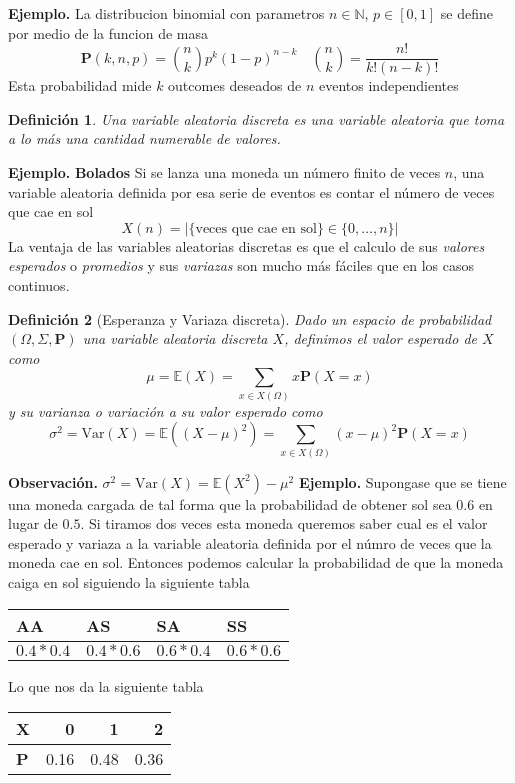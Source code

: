 \documentclass[letterpaper]{article}
\newtheorem{def.}{Definici\'on}[section]
\newcommand{\nat}{\ensuremath{ \mathbb N }}
\newcommand{\prob}{\textbf{P}}
\newcommand{\esp}{\mathbb E}
\newcommand{\eje}{{\newline \noindent \sc \textbf{Ejemplo. }}}
\newcommand{\obs}{{\newline \noindent \sc \textbf{Observación. }}}
\newcommand{\om}{\ensuremath{\Omega}}
\newcommand{\sig}{\ensuremath{\Sigma}}
\begin{document}
\eje La distribucion binomial con parametros \(n\in\nat\), \(p\in[0,1]\) se define por medio de la funcion de masa
\[
    \prob(k,n,p)={n\choose k}p^{k}(1-p)^{n-k}\quad{n\choose k}=\frac{n!}{k!(n-k)!}
\]
Esta probabilidad mide \(k\) outcomes deseados de \(n\) eventos independientes
\begin{def.}
Una variable aleatoria discreta es una variable aleatoria que toma a lo más una cantidad numerable de valores.
\end{def.}
\eje \textbf{Bolados} Si se lanza una moneda un número finito de veces \(n\), una variable aleatoria definida por esa serie de eventos es contar el número de veces que cae en sol
\[
    X(n)=|\{\text{veces que cae en sol}\}\in\{0,\dots,n\}|
\]
La ventaja de las variables aleatorias discretas es que el calculo de sus \emph{valores esperados} o \emph{promedios} y sus \emph{variazas} son mucho más fáciles que en los casos continuos.
\begin{def.}[Esperanza y Variaza discreta]
Dado un espacio de probabilidad \((\om,\sig,\prob)\) una variable aleatoria discreta \(X\), definimos el valor esperado de \(X\) como
\[
    \mu=\esp(X)=\sum_{x\in X(\om)} x\prob(X=x)
\]
y su varianza o variación a su valor esperado como
\[
    \sigma^2=\mathrm{Var}(X)=\esp((X-\mu)^2)=\sum_{x\in X(\om)} (x-\mu)^2\prob(X=x)
\]
\end{def.}
\obs \(\sigma^2=\mathrm{Var}(X)=\esp(X^2)-\mu^2\)
\eje Supongase que se tiene una moneda cargada de tal forma que la probabilidad de obtener sol sea \(0.6\) en lugar de \(0.5\). Si tiramos dos veces esta moneda queremos saber cual es el valor esperado y variaza a la variable aleatoria definida por el númro de veces que la moneda cae en sol. Entonces podemos calcular la probabilidad de que la moneda caiga en sol siguiendo la siguiente tabla
\begin{center}
\begin{tabular}{llll}
AA & AS & SA & SS\\[0pt]
\hline
\(0.4*0.4\) & \(0.4*0.6\) & \(0.6*0.4\) & \(0.6*0.6\)\\[0pt]
\end{tabular}
\end{center}
Lo que nos da la siguiente tabla
\begin{center}
\begin{tabular}{lrrr}
X & 0 & 1 & 2\\[0pt]
\hline
\textbf{P} & 0.16 & 0.48 & 0.36\\[0pt]
\end{tabular}
\end{center}
\end{document}
